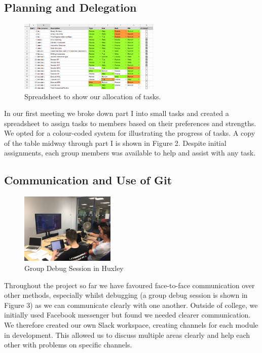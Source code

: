 \documentclass[10pt,twoside]{article}
\begin{document}
\subsection*{Planning and Delegation}
\begin{figure}
\centering
\vspace{-40pt}
\includegraphics[width=0.6\textwidth]{figures/WorkloadBreakdown.png}
\caption{\label{fig:spreadsheet} Spreadsheet to show our allocation of tasks.}
\end{figure}
In our first meeting we broke down part I into small tasks and created a spreadsheet to assign tasks to members based on their preferences and strengths. We opted for a colour-coded system for illustrating the progress of tasks. A copy of the table midway through part I is shown in Figure 2. Despite initial assignments, each group members was available to help and assist with any task.

\subsection*{Communication and Use of Git}
\begin{figure}
\centering
\vspace{-16pt}
\includegraphics[width=0.4\textwidth]{figures/Group_debug_sesh-min.jpg}
\caption{\label{fig:spreadsheet} Group Debug Session in Huxley}
\end{figure}
Throughout the project so far we have favoured face-to-face communication over other methods, especially whilst debugging (a group debug session is shown in Figure 3) as we can communicate clearly with one another. Outside of college, we initially used Facebook messenger but found we needed clearer communication. We therefore created our own Slack workspace, creating channels for each module in development. This allowed us to discuss multiple areas clearly and help each other with problems on specific channels.\\
\linebreak
\end{document}
